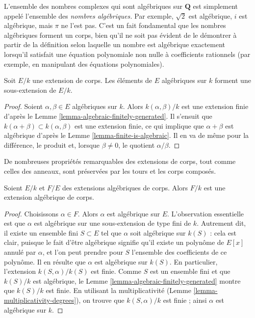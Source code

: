 \noindent
L'ensemble des nombres complexes qui sont algébriques sur $\mathbf{Q}$ est simplement
appelé l'ensemble des {\it nombres algébriques.} Par exemple, $\sqrt{2}$ est algébrique,
$i$ est algébrique, mais $\pi$ ne l'est pas.
C'est un fait fondamental que les nombres algébriques forment un corps, bien qu'il ne soit pas
évident de le démontrer à partir de la définition selon laquelle un nombre est algébrique
exactement lorsqu'il satisfait une équation polynomiale non nulle à coefficients
rationnels (par exemple, en manipulant des équations polynomiales).

\begin{lemma}
\label{lemma-algebraic-elements}
Soit $E/k$ une extension de corps. Les éléments de $E$ algébriques sur $k$
forment une sous-extension de $E/k$.
\end{lemma}

\begin{proof}
Soient $\alpha, \beta \in E$ algébriques sur $k$. Alors $k(\alpha, \beta)/k$
est une extension finie d'après le Lemme \ref{lemma-algebraic-finitely-generated}.
Il s'ensuit que $k(\alpha + \beta) \subset k(\alpha, \beta)$ est une extension
finie, ce qui implique que $\alpha + \beta$ est algébrique d'après le
Lemme \ref{lemma-finite-is-algebraic}. Il en va de même pour la différence,
le produit et, lorsque $\beta \neq 0$, le quotient $\alpha/\beta$.
\end{proof}

\noindent
De nombreuses propriétés remarquables des extensions de corps, tout comme celles des anneaux, sont
préservées par les tours et les corps composés.

\begin{lemma}
\label{lemma-algebraic-permanence}
Soient $E/k$ et $F/E$ des extensions algébriques de corps. Alors $F/k$ est une
extension algébrique de corps.
\end{lemma}

\begin{proof}
Choisissons $\alpha \in F$. Alors $\alpha$ est algébrique sur $E$.
L'observation essentielle est que $\alpha$ est algébrique sur une
sous-extension de type fini de $k$.
Autrement dit, il existe un ensemble fini $S \subset E$ tel que $\alpha $ soit algébrique
sur $k(S)$ : cela est clair, puisque le fait d'être algébrique signifie qu'il existe un
polynôme de $E[x]$ annulé par $\alpha$, et l'on peut prendre pour $S$ l'ensemble des
coefficients de ce polynôme. Il en résulte que $\alpha$ est algébrique sur
$k(S)$. En particulier, l'extension $k(S, \alpha)/ k(S)$ est finie.
Comme $S$ est un ensemble fini et que $k(S)/k$ est algébrique, le
Lemme \ref{lemma-algebraic-finitely-generated} montre que
$k(S)/k$ est finie. En utilisant la multiplicativité
(Lemme \ref{lemma-multiplicativity-degrees}),
on trouve que $k(S,\alpha)/k$ est finie ; ainsi $\alpha$ est algébrique sur $k$.
\end{proof}

